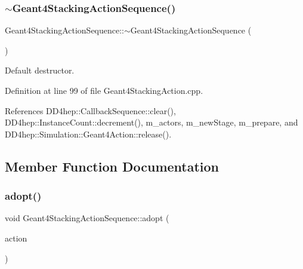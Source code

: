 \subsubsection{\texorpdfstring{$\sim$\+Geant4\+Stacking\+Action\+Sequence()}{~Geant4StackingActionSequence()}}
{\footnotesize\ttfamily Geant4\+Stacking\+Action\+Sequence\+::$\sim$\+Geant4\+Stacking\+Action\+Sequence (\begin{DoxyParamCaption}{ }\end{DoxyParamCaption})\hspace{0.3cm}{\ttfamily [virtual]}}



Default destructor. 



Definition at line 99 of file Geant4\+Stacking\+Action.\+cpp.



References D\+D4hep\+::\+Callback\+Sequence\+::clear(), D\+D4hep\+::\+Instance\+Count\+::decrement(), m\+\_\+actors, m\+\_\+new\+Stage, m\+\_\+prepare, and D\+D4hep\+::\+Simulation\+::\+Geant4\+Action\+::release().



\subsection{Member Function Documentation}
\hypertarget{class_d_d4hep_1_1_simulation_1_1_geant4_stacking_action_sequence_a19b6f7d514d79b40c490226a361d55b4}{}\label{class_d_d4hep_1_1_simulation_1_1_geant4_stacking_action_sequence_a19b6f7d514d79b40c490226a361d55b4} 
\subsubsection{\texorpdfstring{adopt()}{adopt()}}
{\footnotesize\ttfamily void Geant4\+Stacking\+Action\+Sequence\+::adopt (\begin{DoxyParamCaption}\item[{\hyperlink{class_d_d4hep_1_1_simulation_1_1_geant4_stacking_action}{Geant4\+Stacking\+Action} $\ast$}]{action }\end{DoxyParamCaption})}



